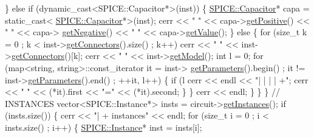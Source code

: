 \begin{DoxyCodeInclude}
                \} \textcolor{keywordflow}{else} \textcolor{keywordflow}{if} (dynamic\_cast<SPICE::Capacitor*>(inst)) \{
                    \hyperlink{class_s_p_i_c_e_1_1_capacitor}{SPICE::Capacitor}* capa = \textcolor{keyword}{static\_cast<}
      \hyperlink{class_s_p_i_c_e_1_1_capacitor}{SPICE::Capacitor}*\textcolor{keyword}{>}(inst);
                    cerr << \textcolor{stringliteral}{" "} << capa->\hyperlink{class_s_p_i_c_e_1_1_capacitor_a1adb347b9a2c2da556e4417ab0eec0e1}{getPositive}() << \textcolor{stringliteral}{" "} << capa->
      \hyperlink{class_s_p_i_c_e_1_1_capacitor_a8b4ab73ed1d99c533aa22af0a37ebb0d}{getNegative}() << \textcolor{stringliteral}{" "} << capa->\hyperlink{class_s_p_i_c_e_1_1_capacitor_a4c052cb2622c580a250b2c783a436882}{getValue}();
                \} \textcolor{keywordflow}{else} \{
                    \textcolor{keywordflow}{for} (\textcolor{keywordtype}{size\_t} k = 0 ; k < inst->\hyperlink{class_s_p_i_c_e_1_1_instance_acce8940edeaa3d79c522006f987e0711}{getConnectors}().size() ; k++)
                        cerr << \textcolor{stringliteral}{" "} << inst->\hyperlink{class_s_p_i_c_e_1_1_instance_acce8940edeaa3d79c522006f987e0711}{getConnectors}()[k];
                    cerr << \textcolor{stringliteral}{" "} << inst->\hyperlink{class_s_p_i_c_e_1_1_instance_afc74cbe93df9c473a53db83a325f8f9d}{getModel}();
                    \textcolor{keywordtype}{int} l = 0;
                    \textcolor{keywordflow}{for} (map<string, string>::const\_iterator it = inst->
      \hyperlink{class_s_p_i_c_e_1_1_instance_aee7d59083b78d31ac5c19ab508da91e0}{getParameters}().begin() ; it != inst->\hyperlink{class_s_p_i_c_e_1_1_instance_aee7d59083b78d31ac5c19ab508da91e0}{getParameters}().end() ; ++it, l++) \{
                        \textcolor{keywordflow}{if} (l%
                            cerr << endl << \textcolor{stringliteral}{"| | | | +"};
                        cerr << \textcolor{stringliteral}{" "} << (*it).first << \textcolor{stringliteral}{"="} << (*it).second;
                    \}
                \}
                cerr << endl;
            \}
        \}
    \}
    \textcolor{comment}{// INSTANCES}
    vector<SPICE::Instance*> insts = circuit->\hyperlink{class_s_p_i_c_e_1_1_circuit_a8e6e58ffab876152a740092520c35d73}{getInstances}();
    \textcolor{keywordflow}{if} (insts.size()) \{
        cerr << \textcolor{stringliteral}{"| + instances"} << endl;
        \textcolor{keywordflow}{for} (\textcolor{keywordtype}{size\_t} i = 0 ; i < insts.size() ; i++) \{
            \hyperlink{class_s_p_i_c_e_1_1_instance}{SPICE::Instance}* inst = insts[i];

\end{DoxyCodeInclude}
